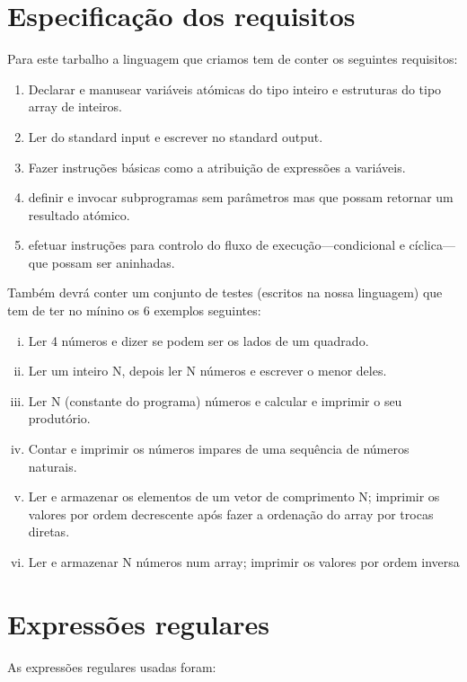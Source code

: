 \documentclass{report}
\begin{document}
\section{Especificação dos requisitos}
\indent
Para este tarbalho a linguagem que criamos tem de conter os seguintes requisitos:
\begin{enumerate}
	\item Declarar e manusear variáveis atómicas do tipo inteiro e estruturas do tipo array de inteiros.
	\item Ler do standard input e escrever no standard output.
	\item Fazer instruções básicas como a atribuição de expressões a variáveis.
	\item definir e invocar subprogramas sem parâmetros mas que possam retornar um resultado atómico.
	\item efetuar instruções para controlo do fluxo de execução—condicional e cíclica—que possam ser aninhadas.
\end{enumerate}
\indent
Também devrá conter um conjunto de testes (escritos na nossa linguagem) que tem de ter no mínino os 6 exemplos seguintes:
\begin{enumerate}[i)]
	\item Ler 4 números e dizer se podem ser os lados de um quadrado.
	\item Ler um inteiro N, depois ler N números e escrever o menor deles.
	\item Ler N (constante do programa) números e calcular e imprimir o seu produtório.
	\item Contar e imprimir os números impares de uma sequência de números naturais.
	\item Ler e armazenar os elementos de um vetor de comprimento N; imprimir os valores por ordem decrescente após
	fazer a ordenação do array por trocas diretas.
	\item Ler e armazenar N números num array; imprimir os valores por ordem inversa
\end{enumerate} 
\section{Expressões regulares} 
As expressões regulares usadas foram:
\end{document}
